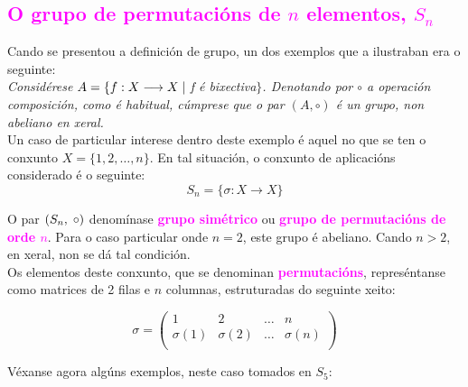 \documentclass[twoside]{report}
\theoremstyle{mystyle}
\begin{document}
\textcolor{magenta}{\section{O grupo de permutacións de $n$ elementos, $S_{n}$}}

\hspace{5mm}

\noindent Cando se presentou a definición de grupo, un dos exemplos que a ilustraban era o seguinte:\\

\noindent \textit{Considérese $A = \{ f: X \longrightarrow X \hspace{1mm} | \hspace{1mm}$f é bixectiva$\}$. Denotando por $\circ$ a operación composición, como é habitual, cúmprese que o par $(A, \circ)$ é un grupo, non abeliano en xeral.} \\

\noindent Un caso de particular interese dentro deste exemplo é aquel no que se ten o conxunto $X = \{1,2, \dots, n\}$. En tal situación, o conxunto de aplicacións considerado é o seguinte:
$$S_{n} = \{ \sigma: X \longrightarrow X\}$$

\noindent O par $(S_{n}, \hspace{1mm} \circ)$ denomínase \textcolor{magenta}{\textbf{grupo simétrico}} ou \textcolor{magenta}{\textbf{grupo de permutacións de orde $n$}}. Para o caso particular onde $n = 2$, este grupo é abeliano. Cando $n > 2$, en xeral, non se dá tal condición.\\

\noindent Os elementos deste conxunto, que se denominan \textcolor{magenta}{\textbf{permutacións}}, represéntanse como matrices de 2 filas e $n$ columnas, estruturadas do seguinte xeito:

$$\sigma = \begin{pmatrix}
1 & 2 & \dots & n\\
\sigma(1) & \sigma(2) & \dots & \sigma(n)\\
\end{pmatrix}$$

\vspace{3mm}

\noindent Véxanse agora algúns exemplos, neste caso tomados en $S_{5}$:
\end{document}
